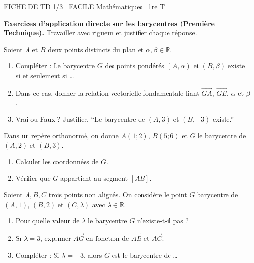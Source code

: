 \documentclass[11pt]{article}
\begin{document}
\begin{tcolorbox}[enhanced,colback=popink,colframe=popink,arc=10pt,boxrule=0pt,left=12pt,right=12pt,top=9pt,bottom=9pt]
{\color{white}\popxbold\small FICHE DE TD 1/3 \textbullet\ FACILE \hfill Mathématiques \textbullet\ 1re T\par}
\end{tcolorbox}
\vspace{4pt}
\noindent \textbf{Exercices d'application directe sur les barycentres (Première Technique).} Travailler avec rigueur et justifier chaque réponse.

\begin{exercice}
Soient $A$ et $B$ deux points distincts du plan et $\alpha, \beta \in \mathbb{R}$.
\begin{enumerate}
    \item Compléter : Le barycentre $G$ des points pondérés $(A,\alpha)$ et $(B,\beta)$ existe si et seulement si \ldots
    \item Dans ce cas, donner la relation vectorielle fondamentale liant $\overrightarrow{GA}$, $\overrightarrow{GB}$, $\alpha$ et $\beta$.
    \item Vrai ou Faux ? Justifier. ``Le barycentre de $(A, 3)$ et $(B, -3)$ existe.''
\end{enumerate}
\end{exercice}

\begin{exercice}
Dans un repère orthonormé, on donne $A(1;2)$, $B(5;6)$ et $G$ le barycentre de $(A,2)$ et $(B,3)$.
\begin{enumerate}
    \item Calculer les coordonnées de $G$.
    \item Vérifier que $G$ appartient au segment $[AB]$.
\end{enumerate}
\end{exercice}

\begin{exercice}
Soient $A, B, C$ trois points non alignés. On considère le point $G$ barycentre de $(A,1)$, $(B,2)$ et $(C,\lambda)$ avec $\lambda \in \mathbb{R}$.
\begin{enumerate}
    \item Pour quelle valeur de $\lambda$ le barycentre $G$ n'existe-t-il pas ?
    \item Si $\lambda = 3$, exprimer $\overrightarrow{AG}$ en fonction de $\overrightarrow{AB}$ et $\overrightarrow{AC}$.
    \item Compléter : Si $\lambda = -3$, alors $G$ est le barycentre de \ldots
\end{enumerate}
\end{exercice}
\end{document}
